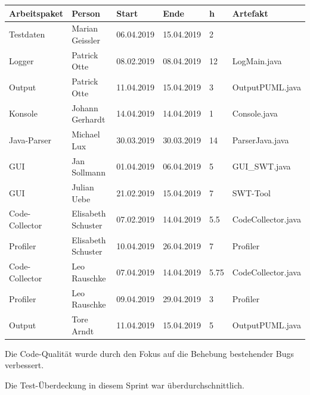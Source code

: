 \begin{longtable}{|p{4cm}|l|l|l|l|l|}
        \hline
        Arbeitspaket & Person & Start & Ende & h & Artefakt\\
        \hline
        Testdaten & Marian Geissler   & 06.04.2019 & 15.04.2019 & 2 &  \\ \hline
        Logger & Patrick Otte   & 08.02.2019 & 08.04.2019 & 12 & LogMain.java \\ \hline
        Output & Patrick Otte   & 11.04.2019 & 15.04.2019 & 3 & OutputPUML.java \\ \hline
        Konsole & Johann Gerhardt   & 14.04.2019 & 14.04.2019 & 1 & Console.java \\ \hline
        Java-Parser & Michael Lux   & 30.03.2019 & 30.03.2019 & 14 & ParserJava.java\\ \hline
        GUI & Jan Sollmann  & 01.04.2019 & 06.04.2019 & 5 & GUI\_SWT.java \\ \hline
        GUI & Julian Uebe  & 21.02.2019 & 15.04.2019 & 7 & SWT-Tool \\ \hline
        Code-Collector & Elisabeth Schuster  & 07.02.2019 & 14.04.2019 & 5.5  & CodeCollector.java \\ \hline
        Profiler & Elisabeth Schuster  & 10.04.2019 & 26.04.2019 & 7  & Profiler \\ \hline
        Code-Collector & Leo Rauschke  & 07.04.2019 & 14.04.2019 & 5.75 & CodeCollector.java \\ \hline
        Profiler & Leo Rauschke  & 09.04.2019 & 29.04.2019 & 3 & Profiler\\ \hline
        Output & Tore Arndt  & 11.04.2019 & 15.04.2019 & 5 & OutputPUML.java\\ \hline
        
        
\end{longtable}     
\nsecend

Die Code-Qualität wurde durch den Fokus auf die Behebung bestehender Bugs verbessert.
\nsecend%

Die Test-Überdeckung in diesem Sprint war überdurchschnittlich.
\nsecend%

